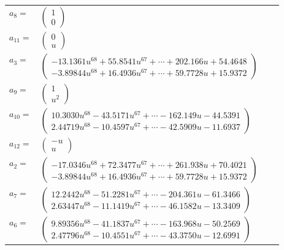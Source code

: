 \documentclass[1p]{elsarticle_modified}
\theoremstyle{definition}
\begin{document}
\begin{tabular}{m{7pt} m{180pt} m{7pt} m{180pt} }
\flushright $a_{8}=$&$\begin{pmatrix}1\\0\end{pmatrix}$ \\
\flushright $a_{11}=$&$\begin{pmatrix}0\\u\end{pmatrix}$ \\
\flushright $a_{3}=$&$\begin{pmatrix}-13.1361 u^{68}+55.8541 u^{67}+\cdots+202.166 u+54.4648\\-3.89844 u^{68}+16.4936 u^{67}+\cdots+59.7728 u+15.9372\end{pmatrix}$ \\
\flushright $a_{9}=$&$\begin{pmatrix}1\\u^2\end{pmatrix}$ \\
\flushright $a_{10}=$&$\begin{pmatrix}10.3030 u^{68}-43.5171 u^{67}+\cdots-162.149 u-44.5391\\2.44719 u^{68}-10.4597 u^{67}+\cdots-42.5909 u-11.6937\end{pmatrix}$ \\
\flushright $a_{12}=$&$\begin{pmatrix}- u\\u\end{pmatrix}$ \\
\flushright $a_{2}=$&$\begin{pmatrix}-17.0346 u^{68}+72.3477 u^{67}+\cdots+261.938 u+70.4021\\-3.89844 u^{68}+16.4936 u^{67}+\cdots+59.7728 u+15.9372\end{pmatrix}$ \\
\flushright $a_{7}=$&$\begin{pmatrix}12.2442 u^{68}-51.2281 u^{67}+\cdots-204.361 u-61.3466\\2.63447 u^{68}-11.1419 u^{67}+\cdots-46.1582 u-13.3409\end{pmatrix}$ \\
\flushright $a_{6}=$&$\begin{pmatrix}9.89356 u^{68}-41.1837 u^{67}+\cdots-163.968 u-50.2569\\2.47796 u^{68}-10.4551 u^{67}+\cdots-43.3750 u-12.6991\end{pmatrix}$ \\

\end{tabular}
\end{document}
